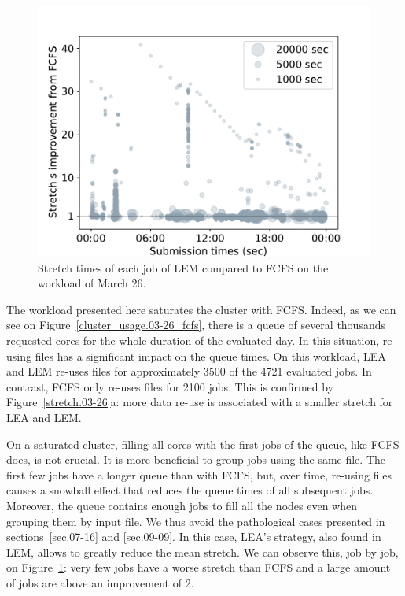 \documentclass[conference,10pt]{IEEEtran}
\begin{document}
\begin{figure}[t]\centering\includegraphics[width=0.9\linewidth]{../MBSS/plot/Stretch_times/Stretch_times_FCFS_LEM_2022-03-26->2022-03-26_V10000_450_128_32_256_4_1024.pdf}\caption{Stretch times of each job of LEM compared to FCFS on the workload of March 26.}\label{vs_fcfs_lem_03-26}\end{figure}

The workload presented here saturates the cluster with FCFS. 
Indeed, as we can see on Figure~\ref{cluster_usage.03-26_fcfs}, there is
a queue of several thousands requested cores
for the whole duration of the evaluated day.
In this situation, re-using files has a significant impact
on the queue times. 
On this workload, LEA and LEM re-uses files for approximately 3500
of the 4721 evaluated jobs. In contrast, FCFS only re-uses files for 2100 jobs.
This is confirmed by Figure~\ref{stretch.03-26}a:
more data re-use is associated with a smaller stretch for LEA and LEM.

On a saturated cluster, filling all cores with the first jobs of the queue, like FCFS does, is not crucial.
It is more beneficial to group jobs using the same file.
The first few jobs have a longer queue than with FCFS,
but, over time, re-using files causes a snowball effect that reduces the 
queue times of all subsequent jobs.
Moreover, the queue contains enough jobs to fill all the nodes even when grouping them by input file.
We thus avoid the pathological cases presented in sections~\ref{sec.07-16} and \ref{sec.09-09}.
In this case, LEA's strategy, also found in LEM, allows to greatly reduce the mean stretch.
We can observe this, job by job, on Figure~\ref{vs_fcfs_lem_03-26}: very few jobs 
have a worse stretch than FCFS and a large amount of jobs are above an improvement of 2. 
\end{document}
